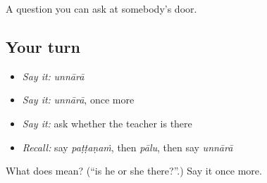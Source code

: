\begin{grammarlens}[title={What you've built}]
A question you can ask at somebody's door.
\end{grammarlens}

\subsection*{Your turn}
\begin{itemize}
\raggedright
  \item \emph{Say it:} \emph{unnārā}
  \item \emph{Say it:} \emph{unnārā}, once more
  \item \emph{Say it:} ask whether the teacher is there
  \item \emph{Recall:} say \emph{paṭṭaṇaṁ}, then \emph{pālu}, then say \emph{unnārā}
\end{itemize}

\begin{tcolorbox}[breakable,colback=teal!4,colframe=teal!35!black,title={Before you move on}]
What does  mean? (\textquotedblleft{}is he or she there?\textquotedblright{}.) Say it once more.
\end{tcolorbox}
